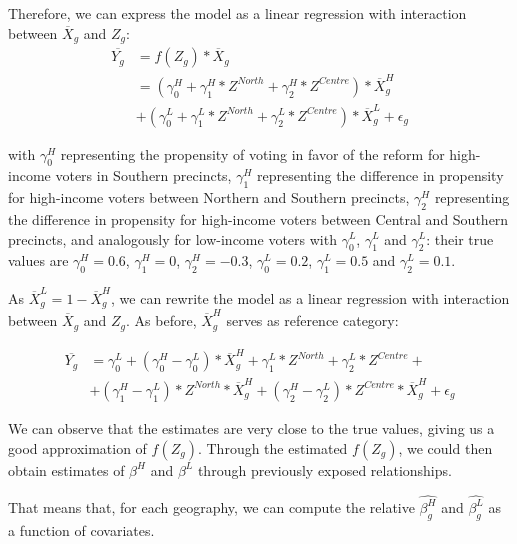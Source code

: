 
Therefore, we can express the model as a linear regression with interaction between $\overline{X}_g$ and $Z_g$:
\begin{align*}
\overline{Y_g}  & = f(Z_g)*\overline{X}_g \\
& = (\gamma_0^H+\gamma_1^H*Z^{North} + \gamma_2^H*Z^{Centre})*\overline{X}_g^H \\
& + (\gamma_0^L+\gamma_1^L*Z^{North}+\gamma_2^L*Z^{Centre})*\overline{X}_g^L + \epsilon_g
\end{align*}

with $\gamma_0^H$ representing the propensity of voting in favor of the reform for high-income voters in Southern precincts, $\gamma_1^H$ representing the difference in propensity for high-income voters between Northern and Southern precincts, $\gamma_2^H$ representing the difference in propensity for high-income voters between Central and Southern precincts, and analogously for low-income voters with $\gamma_0^L$, $\gamma_1^L$ and $\gamma_2^L$: their true values are $\gamma_0^H = 0.6$, $\gamma_1^H = 0$, $\gamma_2^H = -0.3$, $\gamma_0^L = 0.2$, $\gamma_1^L = 0.5$ and $\gamma_2^L = 0.1$.

As $\overline{X}_g^L = 1 - \overline{X}_g^H$, we can rewrite the model as a linear regression with interaction between $\overline{X}_g$ and $Z_g$. As before, $\overline{X}_g^H$ serves as reference category:

\begin{align*}
\overline{Y_g}  & = \gamma_0^L + (\gamma_0^H-\gamma_0^L)*\overline{X}_g^H + \gamma_1^L*Z^{North} + \gamma_2^L*Z^{Centre} +  \\
& + (\gamma_1^H-\gamma_1^L)*Z^{North}*\overline{X}_g^H + (\gamma_2^H-\gamma_2^L)*Z^{Centre}*\overline{X}_g^H + \epsilon_g
\end{align*}



We can observe that the estimates are very close to the true values, giving us a good approximation of $f(Z_g)$.
Through the estimated $f(Z_g)$, we could then obtain estimates of $\beta^H$ and $\beta^L$ through previously exposed relationships.

That means that, for each geography, we can compute the relative $\hat{\beta^H_g}$ and $\hat{\beta^L_g}$ as a function of covariates.

